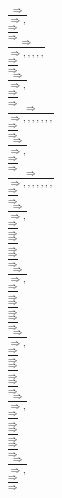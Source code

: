 \documentclass[11pt]{article}
\begin{document}
\begin{center}
\bigskip
\\$\frac{\Rightarrow }{\Rightarrow , }$
\bigskip
\\$\frac{\Rightarrow }{\Rightarrow }$
\bigskip
\\$\frac{\Rightarrow }{\Rightarrow , , , , , }$
\bigskip
\\$\frac{\Rightarrow }{\Rightarrow }$
\bigskip
\\$\frac{\Rightarrow }{\Rightarrow , }$
\bigskip
\\$\frac{\Rightarrow }{\Rightarrow }$
\bigskip
\\$\frac{\Rightarrow }{\Rightarrow , , , , , , , }$
\bigskip
\\$\frac{\Rightarrow }{\Rightarrow }$
\bigskip
\\$\frac{\Rightarrow }{\Rightarrow , }$
\bigskip
\\$\frac{\Rightarrow }{\Rightarrow }$
\bigskip
\\$\frac{\Rightarrow }{\Rightarrow , , , , , , , }$
\bigskip
\\$\frac{\Rightarrow }{\Rightarrow }$
\bigskip
\\$\frac{\Rightarrow }{\Rightarrow , }$
\bigskip
\\$\frac{\Rightarrow }{\Rightarrow }$
\bigskip
\\$\frac{\Rightarrow }{\Rightarrow }$
\bigskip
\\$\frac{\Rightarrow }{\Rightarrow }$
\bigskip
\\$\frac{\Rightarrow }{\Rightarrow , }$
\bigskip
\\$\frac{\Rightarrow }{\Rightarrow }$
\bigskip
\\$\frac{\Rightarrow }{\Rightarrow }$
\bigskip
\\$\frac{\Rightarrow }{\Rightarrow }$
\bigskip
\\$\frac{\Rightarrow }{\Rightarrow , }$
\bigskip
\\$\frac{\Rightarrow }{\Rightarrow }$
\bigskip
\\$\frac{\Rightarrow }{\Rightarrow }$
\bigskip
\\$\frac{\Rightarrow }{\Rightarrow }$
\bigskip
\\$\frac{\Rightarrow }{\Rightarrow , }$
\bigskip
\\$\frac{\Rightarrow }{\Rightarrow }$
\bigskip
\\$\frac{\Rightarrow }{\Rightarrow }$
\bigskip
\\$\frac{\Rightarrow }{\Rightarrow }$
\bigskip
\\$\frac{\Rightarrow }{\Rightarrow , }$
\bigskip
\\$\frac{\Rightarrow }{\Rightarrow }$

\end{center}
\end{document}
